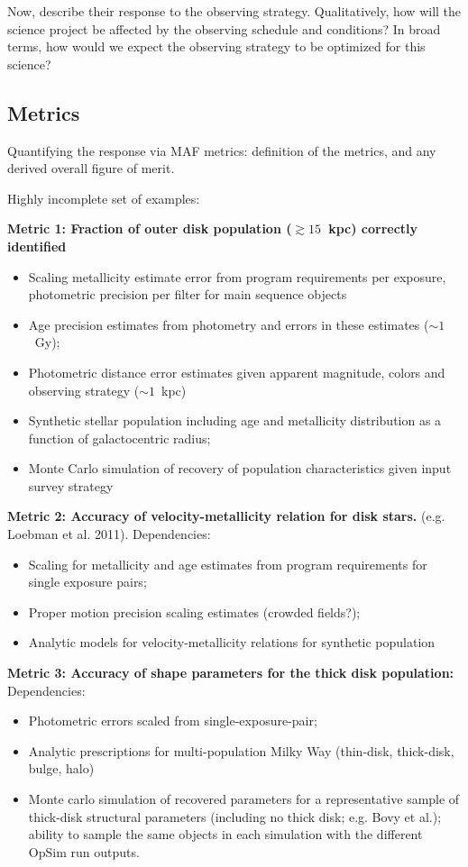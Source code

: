 Now, describe their response to the observing strategy. Qualitatively,
how will the science project be affected by the observing schedule and
conditions? In broad terms, how would we expect the observing strategy
to be optimized for this science?



\subsection{Metrics}
\label{sec:keyword:metrics}

Quantifying the response via MAF metrics: definition of the metrics,
and any derived overall figure of merit.

Highly incomplete set of examples:

{\bf Metric 1: Fraction of outer disk population ($\gtrsim 15$~kpc) correctly identified}
\begin{itemize}
  \item Scaling metallicity estimate error from program requirements per exposure, photometric precision per filter for main sequence objects
    \item Age precision estimates from photometry and errors in these estimates ($\sim 1$~Gy);
      \item Photometric distance error estimates given apparent magnitude, colors and observing strategy ($\sim 1$~kpc)
        \item Synthetic stellar population including age and metallicity distribution as a function of galactocentric radius;
          \item Monte Carlo simulation of recovery of population
            characteristics given input survey strategy
\end{itemize}

{\bf Metric 2: Accuracy of velocity-metallicity relation for disk stars.} (e.g. Loebman et al. 2011). Dependencies:
\begin{itemize}
  \item Scaling for metallicity and age estimates from program requirements for single exposure pairs;
    \item Proper motion precision scaling estimates (crowded fields?); 
  \item Analytic models for velocity-metallicity relations for synthetic population
\end{itemize} 

{\bf Metric 3: Accuracy of shape parameters for the thick disk population:} Dependencies:
\begin{itemize}
  \item Photometric errors scaled from single-exposure-pair;
    \item Analytic prescriptions for multi-population Milky Way (thin-disk, thick-disk, bulge, halo)
      \item Monte carlo simulation of recovered parameters for a representative sample of thick-disk structural parameters (including no thick disk; e.g. Bovy et al.); ability to sample the same objects in each simulation with the different OpSim run outputs. 
\end{itemize}

